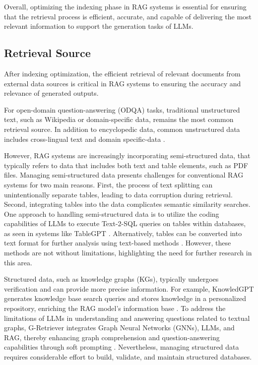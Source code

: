 Overall, optimizing the indexing phase in RAG systems is essential for ensuring that the retrieval process is efficient, accurate, and capable of delivering the most relevant information to support the generation tasks of LLMs.

\subsection{Retrieval Source}

After indexing optimization, the efficient retrieval of relevant documents from external data sources is critical in RAG systems to ensuring the accuracy and relevance of generated outputs.

For open-domain question-answering (ODQA) tasks, traditional unstructured text, such as Wikipedia or domain-specific data, remains the most common retrieval source. In addition to encyclopedic data, common unstructured data includes cross-lingual text and domain specific-data \cite{li2023classification}.

However, RAG systems are increasingly incorporating semi-structured data, that typically refers to data that includes both text and table elements, such as PDF files. Managing semi-structured data presents challenges for conventional RAG systems for two main reasons. First, the process of text splitting can unintentionally separate tables, leading to data corruption during retrieval. Second, integrating tables into the data complicates semantic similarity searches. One approach to handling semi-structured data is to utilize the coding capabilities of LLMs to execute Text-2-SQL queries on tables within databases, as seen in systems like TableGPT \cite{zha2023tablegpt}. Alternatively, tables can be converted into text format for further analysis using text-based methods \cite{luo2023augmented}. However, these methods are not without limitations, highlighting the need for further research in this area.

Structured data, such as knowledge graphs (KGs), typically undergoes verification and can provide more precise information. For example, KnowledGPT generates knowledge base search queries and stores knowledge in a personalized repository, enriching the RAG model’s information base \cite{wang2023knowledgpt}. To address the limitations of LLMs in understanding and answering questions related to textual graphs, G-Retriever integrates Graph Neural Networks (GNNs), LLMs, and RAG, thereby enhancing graph comprehension and question-answering capabilities through soft prompting \cite{he2024g}. Nevertheless, managing structured data requires considerable effort to build, validate, and maintain structured databases.

